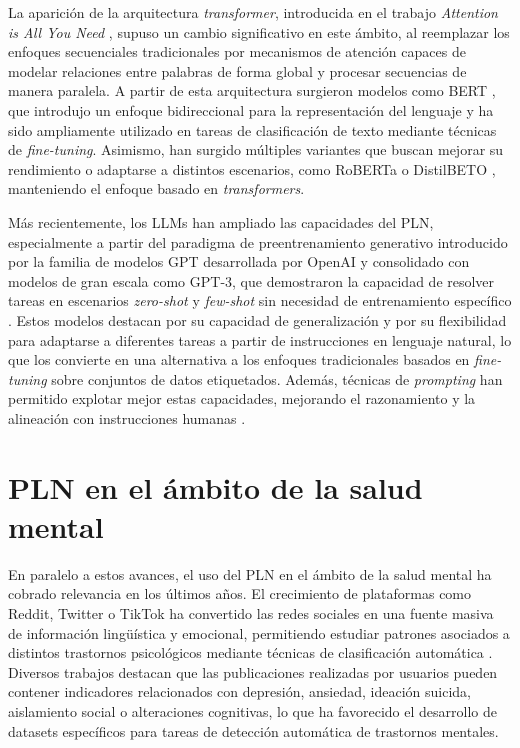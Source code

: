 La aparición de la arquitectura \textit{transformer}, introducida en el trabajo \textit{Attention is All You Need} \cite{vaswani_attention_2017}, supuso un cambio significativo en este ámbito, al reemplazar los enfoques secuenciales tradicionales por mecanismos de atención capaces de modelar relaciones entre palabras de forma global y procesar secuencias de manera paralela. A partir de esta arquitectura surgieron modelos como \acs{BERT} \cite{devlin_bert_2019}, que introdujo un enfoque bidireccional para la representación del lenguaje y ha sido ampliamente utilizado en tareas de clasificación de texto mediante técnicas de \textit{fine-tuning}. Asimismo, han surgido múltiples variantes que buscan mejorar su rendimiento o adaptarse a distintos escenarios, como RoBERTa \cite{liu_roberta_2019} o DistilBETO \cite{sanh_distilbert_2020}, manteniendo el enfoque basado en \textit{transformers}.

Más recientemente, los \acp{LLM} han ampliado las capacidades del \ac{PLN}, especialmente a partir del paradigma de preentrenamiento generativo introducido por la familia de modelos \acs{GPT} desarrollada por OpenAI \cite{radford_improving_2018} y consolidado con modelos de gran escala como GPT-3, que demostraron la capacidad de resolver tareas en escenarios \textit{zero-shot} y \textit{few-shot} sin necesidad de entrenamiento específico \cite{brown_language_2020}. Estos modelos destacan por su capacidad de generalización y por su flexibilidad para adaptarse a diferentes tareas a partir de instrucciones en lenguaje natural, lo que los convierte en una alternativa a los enfoques tradicionales basados en \textit{fine-tuning} sobre conjuntos de datos etiquetados. Además, técnicas de \textit{prompting} han permitido explotar mejor estas capacidades, mejorando el razonamiento y la alineación con instrucciones humanas \cite{wei_chain--thought_2022}.

\section{PLN en el ámbito de la salud mental}

En paralelo a estos avances, el uso del \ac{PLN} en el ámbito de la salud mental ha cobrado relevancia en los últimos años. El crecimiento de plataformas como Reddit, Twitter o TikTok ha convertido las redes sociales en una fuente masiva de información lingüística y emocional, permitiendo estudiar patrones asociados a distintos trastornos psicológicos mediante técnicas de clasificación automática \cite{ge_survey_2025}. Diversos trabajos destacan que las publicaciones realizadas por usuarios pueden contener indicadores relacionados con depresión, ansiedad, ideación suicida, aislamiento social o alteraciones cognitivas, lo que ha favorecido el desarrollo de datasets específicos para tareas de detección automática de trastornos mentales.

